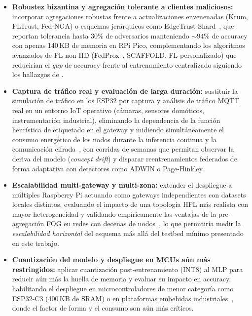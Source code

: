 \begin{itemize}
    \item \textbf{Robustez bizantina y agregación tolerante a clientes maliciosos:} incorporar agregaciones robustas frente a actualizaciones envenenadas (Krum, FLTrust, Fed-NGA) o esquemas jerárquicos como EdgeTrust-Shard~\cite{Tran2026_EdgeTrustShard}, que reportan tolerancia hasta $30\%$ de adversarios manteniendo $\sim 94\%$ de accuracy con apenas 140\,KB de memoria en RPi Pico, complementando los algoritmos avanzados de FL non-IID (FedProx~\cite{Li2020FedProx}, SCAFFOLD, FL personalizado) que reducirían el \emph{gap} de accuracy frente al entrenamiento centralizado siguiendo los hallazgos de \cite{Roy2023_FL_AdaptedModel}.

    \item \textbf{Captura de tráfico real y evaluación de larga duración:} sustituir la simulación de tráfico en los ESP32 por captura y análisis de tráfico MQTT real en un entorno IoT operativo (cámaras, sensores domóticos, instrumentación industrial), eliminando la dependencia de la función heurística de etiquetado en el gateway y midiendo simultáneamente el consumo energético de los nodos durante la inferencia continua y la comunicación cifrada~\cite{Tekin2023_OnDeviceEnergy}, con corridas de semanas que permitan observar la deriva del modelo (\emph{concept drift}) y disparar reentrenamientos federados de forma adaptativa con detectores como ADWIN o Page-Hinkley.

    \item \textbf{Escalabilidad multi-gateway y multi-zona:} extender el despliegue a múltiples Raspberry Pi actuando como gateways independientes con datasets locales distintos, evaluando el impacto de una topología HFL más realista con mayor heterogeneidad y validando empíricamente las ventajas de la pre-agregación FOG en redes con decenas de nodos~\cite{Wang2019_DataFusion_CPSS}, lo que permitiría medir la \emph{escalabilidad horizontal} del esquema más allá del testbed mínimo presentado en este trabajo.

    \item \textbf{Cuantización del modelo y despliegue en MCUs aún más restringidos:} aplicar cuantización post-entrenamiento (INT8) al MLP para reducir aún más la huella de memoria y evaluar su impacto en accuracy, habilitando el despliegue en microcontroladores de menor categoría como ESP32-C3 (400\,KB de SRAM) o en plataformas embebidas industriales~\cite{Dini2024_EmbeddedIIoT_Review}, donde el factor de forma y el consumo son aún más críticos.


\end{itemize}
